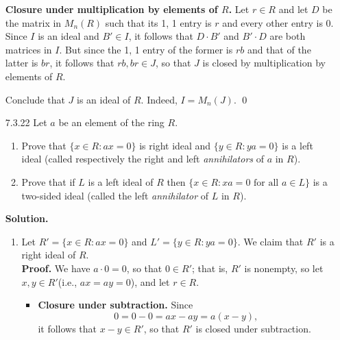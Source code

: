 \begin{enumerate}
      \textbf{Closure under multiplication by elements of $R$.} Let $r \in R$
      and let $D$ be the matrix in $M_n(R)$ such that its 1, 1 entry is $r$ and
      every other entry is 0. Since $I$ is an ideal and $B' \in I$, it follows
      that $D \cdot B'$ and $B' \cdot D$ are both matrices in $I$. But since the
      1, 1 entry of the former is $rb$ and that of the latter is $br$, it
      follows that $rb, br \in J$, so that $J$ is closed by multiplication by
      elements of $R$.

      Conclude that $J$ is an ideal of $R$. Indeed, $I = M_n(J)$. \qed
   \item[7.3.22]  Let $a$ be an element of the ring $R$.
                  \begin{enumerate}
                     \item Prove that $\{x \in R : ax = 0\}$ is right ideal and
                           $\{y \in R : ya = 0\}$ is a left ideal (called
                           respectively the right and left \textit{annihilators}
                           of $a$ in $R$).
                     \item Prove that if $L$ is a left ideal of $R$ then
                           $\{x \in R : xa = 0 \text{ for all } a \in L\}$ is a
                           two-sided ideal (called the left \textit{annihilator}
                           of $L$ in $R$).
                  \end{enumerate}

      \textbf{Solution.}

      \begin{enumerate}
         \item Let $R' = \{x \in R : ax = 0\}$ and $L' = \{y \in R : ya = 0\}$.
               We claim that $R'$ is a right ideal of $R$. \\

               \textbf{Proof.} We have $a \cdot 0 = 0$, so that $0 \in R'$; that 
               is, $R'$ is nonempty, so let $x, y \in R'$(i.e., $ax = ay = 0$), 
               and let $r \in R$.

               \begin{itemize}
                  \item \textbf{Closure under subtraction.} Since
                        $$0 = 0 - 0 = ax - ay = a(x - y),$$
                        it follows that $x - y \in R'$, so that $R'$ is closed 
                        under subtraction.


\end{itemize}
\end{enumerate}
\end{enumerate}
